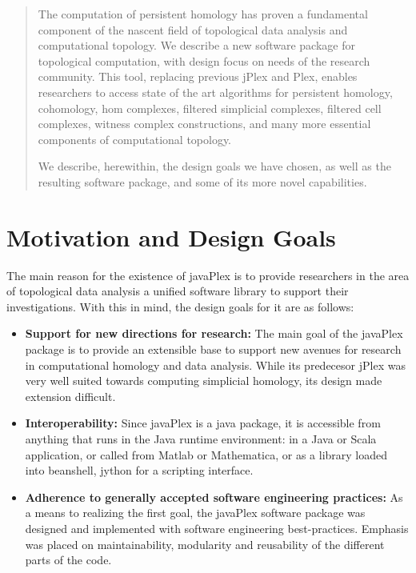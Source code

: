 \begin{abstract}
The computation of persistent homology has proven a fundamental component of the nascent field of topological data analysis and computational topology. We describe a new software package for topological computation, with design focus on needs of the research community. This tool, replacing previous jPlex and Plex, enables researchers to access state of the art algorithms for persistent homology, cohomology, hom complexes, filtered simplicial complexes, filtered cell complexes, witness complex constructions, and many more essential components of computational topology.

We describe, herewithin, the design goals we have chosen, as well as the resulting software package, and some of its more novel capabilities.

\end{abstract}

\section{Motivation and Design Goals}

The main reason for the existence of javaPlex is to provide researchers in the area of topological data analysis a unified software library to support their investigations. With this in mind, the design goals for it are as follows:

\begin{itemize}
\item {\bf Support for new directions for research: } The main goal of the javaPlex package is to provide an extensible base to support new avenues for research in computational homology and data analysis. While its predecesor jPlex was very well suited towards computing simplicial homology, its design made extension difficult.
\item {\bf Interoperability: } Since javaPlex is a java package, it is
  accessible from anything that runs in the Java runtime environment:
  in a Java or Scala application, or called from Matlab or Mathematica, or as a
  library loaded into beanshell, jython for a scripting interface.
\item {\bf Adherence to generally accepted software engineering practices: } As a means to realizing the first goal, the javaPlex software package was designed and implemented with software engineering best-practices. Emphasis was placed on maintainability, modularity and reusability of the different parts of the code.
\end{itemize}

